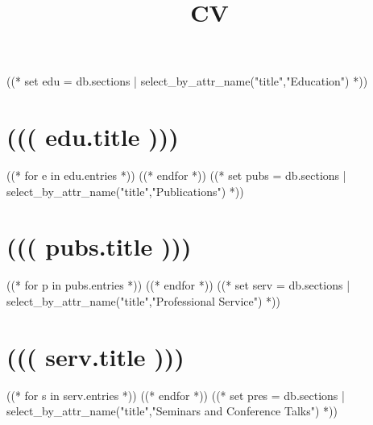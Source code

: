 \documentclass[10pt,a4paper,sans]{moderncv}
\title{CV}
\begin{document}
  \makecvtitle
  ((* set edu = db.sections | select_by_attr_name("title","Education") *))
  \section{((( edu.title )))}
  ((* for e in edu.entries *))
  ((* endfor *))
  ((* set pubs = db.sections | select_by_attr_name("title","Publications") *))
  \section{((( pubs.title )))}
  ((* for p in pubs.entries *))
  ((* endfor *))
  ((* set serv = db.sections | select_by_attr_name("title","Professional Service") *))
  \section{((( serv.title )))}
  ((* for s in serv.entries *))
  ((* endfor *))
  ((* set pres = db.sections | select_by_attr_name("title","Seminars and Conference Talks") *))
\end{document}

